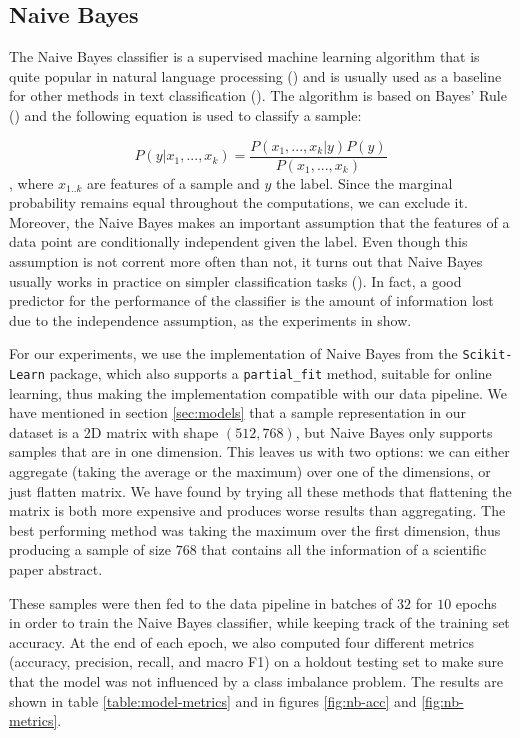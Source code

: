 \documentclass[12pt]{extreport}
\begin{document}
\subsection{Naive Bayes} \label{sec:nb}

The Naive Bayes classifier is a supervised machine learning algorithm that is quite popular in natural language processing (\cite{naivebayes}) and is usually used as a baseline for other methods in text classification (\cite{nb-baseline}). The algorithm is based on Bayes' Rule (\cite{bayesrule}) and the following equation is used to classify a sample:

\begin{equation}
    P(y|x_1, ..., x_k) = \frac{P(x_1, ..., x_k|y)P(y)}{P(x_1, ..., x_k)}
\end{equation}
, where $x_{1..k}$ are features of a sample and $y$ the label. Since the marginal probability remains equal throughout the computations, we can exclude it. Moreover, the Naive Bayes makes an important assumption that the features of a data point are conditionally independent given the label. Even though this assumption is not corrent more often than not, it turns out that Naive Bayes usually works in practice on simpler classification tasks (\cite{naivebayes}). In fact, a good predictor for the performance of the classifier is the amount of information lost due to the independence assumption, as the experiments in \cite{naivebayes} show.

For our experiments, we use the implementation of Naive Bayes from the \texttt{Scikit-Learn} package, which also supports a \texttt{partial\_fit} method, suitable for online learning, thus making the implementation compatible with our data pipeline. We have mentioned in section \ref{sec:models} that a sample representation in our dataset is a 2D matrix with shape $(512, 768)$, but Naive Bayes only supports samples that are in one dimension. This leaves us with two options: we can either aggregate (taking the average or the maximum) over one of the dimensions, or just flatten matrix. We have found by trying all these methods that flattening the matrix is both more expensive and produces worse results than aggregating. The best performing method was taking the maximum over the first dimension, thus producing a sample of size $768$ that contains all the information of a scientific paper abstract.

These samples were then fed to the data pipeline in batches of $32$ for $10$ epochs in order to train the Naive Bayes classifier, while keeping track of the training set accuracy. At the end of each epoch, we also computed four different metrics (accuracy, precision, recall, and macro F1) on a holdout testing set to make sure that the model was not influenced by a class imbalance problem. The results are shown in table \ref{table:model-metrics} and in figures \ref{fig:nb-acc} and \ref{fig:nb-metrics}.
\end{document}

